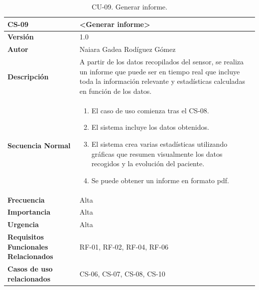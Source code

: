 \begin{table}[h!]
\centering
\begin{tabular}{ |m{3cm}|m{11cm}|  } 
\hline
\cellcolor[HTML]{B9E3F0}\textbf{CS-09} & \cellcolor[HTML]{B9E3F0}\textbf{<Generar informe>}\\

\hline
\cellcolor[HTML]{EFEFEF}\textbf{Versión}             & 1.0  \\
\hline
\cellcolor[HTML]{EFEFEF}\textbf{Autor}                & Naiara Gadea Rodíguez Gómez\\
\hline
\cellcolor[HTML]{EFEFEF}\textbf{Descripción}                & {A partir de los datos recopilados del sensor, se realiza un informe que puede ser en tiempo real que incluye toda la información relevante y estadísticas calculadas en función de los datos. }\\
\hline
\cellcolor[HTML]{EFEFEF}\textbf{Secuencia \newline Normal}                &                 
        \begin{enumerate}
			\def\labelenumi{\arabic{enumi}.}
			\tightlist
			\item El caso de uso comienza tras el CS-08.
			\item El sistema incluye los datos obtenidos. 
                \item El sistema crea varias estadísticas utilizando gráficas que resumen visualmente los datos recogidos y la evolución del paciente.
                \item Se puede obtener un informe en formato pdf. 
		\end{enumerate}\\
\hline
\cellcolor[HTML]{EFEFEF}\textbf{Frecuencia}                & Alta\\
\hline
\cellcolor[HTML]{EFEFEF}\textbf{Importancia}                & Alta\\
\hline
\cellcolor[HTML]{EFEFEF}\textbf{Urgencia}                & Alta\\
\hline
\cellcolor[HTML]{EFEFEF}\textbf{Requisitos Funcionales Relacionados}                & {RF-01, RF-02, RF-04, RF-06 }\\
\hline
\cellcolor[HTML]{EFEFEF}\textbf{Casos de uso relacionados}                & {CS-06, CS-07, CS-08, CS-10 }\\
\hline
\end{tabular}
\caption{CU-09. Generar informe.}
\end{table}

